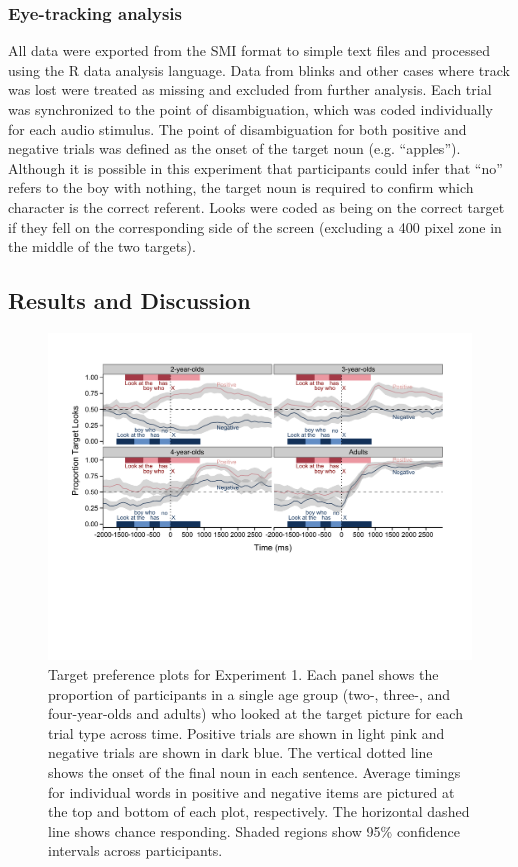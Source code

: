 \documentclass[man]{apa2}
\begin{document}
\subsubsection{Eye-tracking analysis}

All data were exported from the SMI format to simple text files and processed using the R data analysis language. Data from blinks and other cases where track was lost were treated as missing and excluded from further analysis. Each trial was synchronized to the point of disambiguation, which was coded individually for each audio stimulus. The point of disambiguation for both positive and negative trials was defined as the onset of the target noun (e.g. ``apples'').  Although it is possible in this experiment that participants could infer that ``no'' refers to the boy with nothing, the target noun is required to confirm which character is the correct referent. Looks were coded as being on the correct target if they fell on the corresponding side of the screen (excluding a  400 pixel zone in the middle of the two targets).  

\subsection{Results and Discussion}

\begin{figure}
\begin{center} 
\includegraphics[width=6in]{simpleplots_nothing.pdf}
\caption{\label{fig:e1simple} Target preference plots for Experiment 1. Each panel shows the proportion of participants in a single age group (two-, three-, and four-year-olds and adults) who looked at the target picture for each trial type across time. Positive trials are shown in light pink and negative trials are shown in dark blue.  The vertical dotted line shows the onset of the final noun in each sentence. Average timings for individual words in positive and negative items are pictured at the top and bottom of each plot, respectively. The horizontal dashed line shows chance responding. Shaded regions show 95\% confidence intervals across participants.}
\end{center} 
\end{figure}
\end{document}
